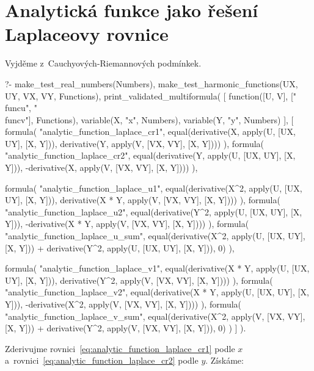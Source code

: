 
\section{Analytická funkce jako řešení Laplaceovy rovnice}

Vyjděme z~Cauchyových-Riemannových podmínkek.

\begin{prolog}
?-	make_test_real_numbers(Numbers),
	make_test_harmonic_functions(UX, UY, VX, VY, Functions),
	print_validated_multiformula(
		[
			function([U, V], ["\\func{u}", "\\func{v}"], Functions),
			variable(X, "x", Numbers),
			variable(Y, "y", Numbers)
		],
		[
			formula(
				"analytic_function_laplace_cr1",
				equal(derivative(X, apply(U, [UX, UY], [X, Y])), derivative(Y, apply(V, [VX, VY], [X, Y])))
			),
			formula(
				"analytic_function_laplace_cr2",
				equal(derivative(Y, apply(U, [UX, UY], [X, Y])), -derivative(X, apply(V, [VX, VY], [X, Y])))
			),
			
			formula(
				"analytic_function_laplace_u1",
				equal(derivative(X^2, apply(U, [UX, UY], [X, Y])), derivative(X * Y, apply(V, [VX, VY], [X, Y])))
			),
			formula(
				"analytic_function_laplace_u2",
				equal(derivative(Y^2, apply(U, [UX, UY], [X, Y])), -derivative(X * Y, apply(V, [VX, VY], [X, Y])))
			),
			formula(
				"analytic_function_laplace_u_sum",
				equal(derivative(X^2, apply(U, [UX, UY], [X, Y])) + derivative(Y^2, apply(U, [UX, UY], [X, Y])), 0)
			),
			
			formula(
				"analytic_function_laplace_v1",
				equal(derivative(X * Y, apply(U, [UX, UY], [X, Y])), derivative(Y^2, apply(V, [VX, VY], [X, Y])))
			),
			formula(
				"analytic_function_laplace_v2",
				equal(derivative(X * Y, apply(U, [UX, UY], [X, Y])), -derivative(X^2, apply(V, [VX, VY], [X, Y])))
			),
			formula(
				"analytic_function_laplace_v_sum",
				equal(derivative(X^2, apply(V, [VX, VY], [X, Y])) + derivative(Y^2, apply(V, [VX, VY], [X, Y])), 0)
			)
		]
	).
\end{prolog}


Zderivujme rovnici~\eqref{eq:analytic_function_laplace_cr1} podle \(x\) a~rovnici~\eqref{eq:analytic_function_laplace_cr2} podle \(y\). Získáme:

